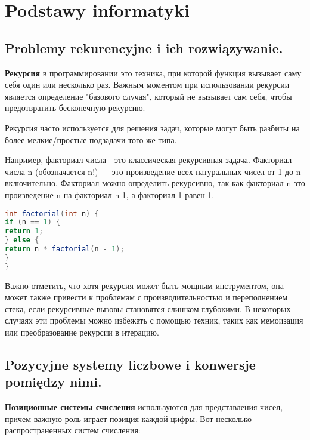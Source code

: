 \chapter{Podstawy informatyki}
\section{Problemy rekurencyjne i ich rozwiązywanie. }

\textbf{Рекурсия} в программировании это техника, при которой функция вызывает саму себя один или несколько раз. Важным моментом при использовании рекурсии является определение "базового случая", который не вызывает сам себя, чтобы предотвратить бесконечную рекурсию.

Рекурсия часто используется для решения задач, которые могут быть разбиты на более мелкие/простые подзадачи того же типа.

Например, факториал числа - это классическая рекурсивная задача. Факториал числа n (обозначается n!) — это произведение всех натуральных чисел от 1 до n включительно. Факториал можно определить рекурсивно, так как факториал n это произведение n на факториал n-1, а факториал 1 равен 1.

\begin{lstlisting}[language=Java]
int factorial(int n) {
if (n == 1) {
return 1;
} else {
return n * factorial(n - 1);
}
}
\end{lstlisting}

Важно отметить, что хотя рекурсия может быть мощным инструментом, она может также привести к проблемам с производительностью и переполнением стека, если рекурсивные вызовы становятся слишком глубокими. В некоторых случаях эти проблемы можно избежать с помощью техник, таких как мемоизация или преобразование рекурсии в итерацию.

\section{Pozycyjne systemy liczbowe i konwersje pomiędzy nimi. }

\textbf{Позиционные системы счисления} используются для представления чисел, причем важную роль играет позиция каждой цифры. Вот несколько распространенных систем счисления:

